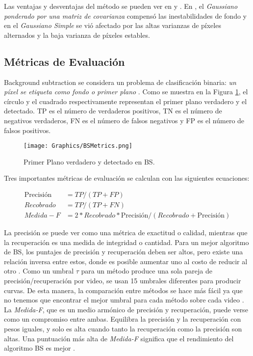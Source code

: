Las ventajas y desventajas del método se pueden ver en \cite{BenezethJodoinEmileLaurentRosenberger} y \cite{GreffBrandoKrauStrickerClua}. En \cite{BenezethJodoinEmileLaurentRosenberger}, el \textit{Gaussiano ponderado por una matriz de covarianza} compensó las inestabilidades de fondo y en \cite{GreffBrandoKrauStrickerClua} el \textit{Gaussiano Simple} se vió afectado por las altas varianzas de píxeles alternados y la baja varianza de píxeles estables.

\subsection{Métricas de Evaluación}

Background subtraction se considera un problema de clasificación binaria: \textit {un píxel se etiqueta como fondo o primer plano} \cite{GuangleTaoJiandanPingWenwu}. Como se muestra en la Figura \ref{fig:BSMetrics}, el círculo y el cuadrado respectivamente representan el primer plano verdadero y el detectado. TP es el número de verdaderos positivos, TN es el número de negativos verdaderos, FN es el número de falsos negativos y FP es el número de falsos positivos.\\

\begin{figure}[!h]
    \centering
    \texttt{[image: Graphics/BSMetrics.png]}
    \caption{Primer Plano verdadero y detectado en BS.}
    \label{fig:BSMetrics}
\end{figure}

Tres importantes métricas de evaluación se calculan con las siguientes ecuaciones:

\begin{equation*}
    \begin{split}
        \text{Precisión} & = TP/(TP + FP)\\
        Recobrado & = TP/(TP + FN)\\
        Medida-F & =  2 * Recobrado * \text{Precisión}/(Recobrado + \text{Precisión})
    \end{split}
\end{equation*}

La precisión se puede ver como una métrica de exactitud o calidad, mientras que la recuperación es una medida de integridad o cantidad. Para un mejor algoritmo de BS, los puntajes de precisión y recuperación deben ser altos, pero existe una relación inversa entre estos, donde es posible aumentar uno al costo de reducir al otro \cite{GuangleTaoJiandanPingWenwu}. Como un umbral $\tau$ para un método produce una sola pareja de precisión/recuperación por video, se usan 15 umbrales diferentes para producir curvas. De esta manera, la comparación entre métodos se hace más fácil ya que no tenemos que encontrar el mejor umbral para cada método sobre cada video \cite{YannickPierreMarcBrunoHeleneChristophe}. La \textit{Medida-F}, que es un medio armónico de precisión y recuperación, puede verse como un compromiso entre ambas. Equilibra la precisión y la recuperación con pesos iguales, y solo es alta cuando tanto la recuperación como la precisión son altas. Una puntuación más alta de \textit{Medida-F} significa que el rendimiento del algoritmo BS es mejor \cite{GuangleTaoJiandanPingWenwu}.

